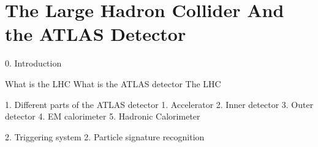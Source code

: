 \chapter{The Large Hadron Collider And the ATLAS Detector}
\label{chapter:ATLAS}
0. Introduction

    What is the LHC
    What is the ATLAS detector
    The LHC


1. Different parts of the ATLAS detector 
    1. Accelerator 
    2. Inner detector
    3. Outer detector
    4. EM calorimeter
    5. Hadronic Calorimeter

2. Triggering system 
2. Particle signature recognition
